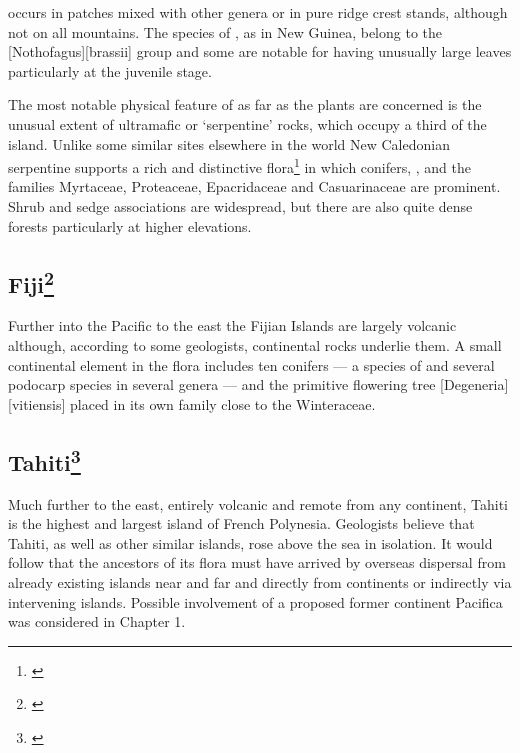  occurs in patches mixed with other genera or in pure ridge crest stands, although not on all mountains.
The species of , as in New Guinea, belong to the [Nothofagus][brassii] group and some are notable for having unusually large leaves particularly at the juvenile stage.

The most notable physical feature of  as far as the plants are concerned is the unusual extent of ultramafic or `serpentine' rocks, which occupy a third of the island.
Unlike some similar sites elsewhere in the world New Caledonian serpentine supports a rich and distinctive flora\footnote{\cite{moratph1986affinites}} in which conifers, , and the families Myrtaceae, Proteaceae, Epacridaceae and Casuarinaceae are prominent.
Shrub and sedge associations are widespread, but there are also quite dense forests particularly at higher elevations.

\subsection[Fiji]{Fiji\thinspace\footnote{\cite{carlquist1965island}}}

Further into the Pacific to the east the Fijian Islands are largely volcanic although, according to some geologists, continental rocks underlie them.
A small continental element in the flora includes ten conifers --- a species of  and several podocarp species in several genera --- and the primitive flowering tree [Degeneria][vitiensis] placed in its own family close to the Winteraceae.

\subsection[Tahiti]{Tahiti\thinspace\footnote{\cite{carlquist1965island}}}

Much further to the east, entirely volcanic and remote from any continent, Tahiti is the highest and largest island of French Polynesia.
Geologists believe that Tahiti, as well as other similar islands, rose above the sea in isolation.
It would follow that the ancestors of its flora must have arrived by overseas dispersal from already existing islands near and far and directly from continents or indirectly via intervening islands.
Possible involvement of a proposed former continent Pacifica was considered in Chapter 1.

